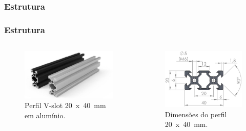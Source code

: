 \subsubsection{Estrutura}

\begin{frame}
\frametitle{Estrutura}

\begin{columns}
        \begin{figure}
            \centering
            \includegraphics[scale = 0.14]{figuras/p20x40p}
            \caption{Perfil V-slot  20~x~40~mm em alumínio.}
        \end{figure}
        \begin{figure}
            \centering
            \includegraphics[scale = 0.14]{figuras/p20x40d.jpeg}
            \caption{Dimensões do perfil 20~x~40~mm.}
        \end{figure}
\end{columns}

\end{frame}

